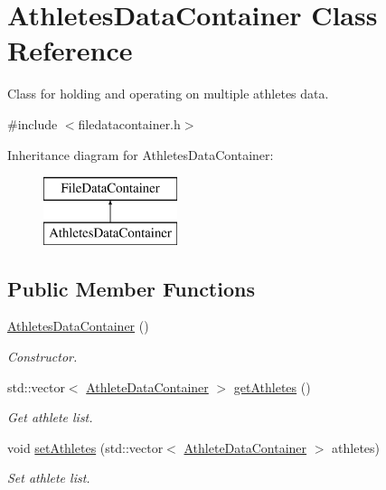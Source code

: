 \hypertarget{classAthletesDataContainer}{}\section{Athletes\+Data\+Container Class Reference}
\label{classAthletesDataContainer}


Class for holding and operating on multiple athletes data.  




{\ttfamily \#include $<$filedatacontainer.\+h$>$}

Inheritance diagram for Athletes\+Data\+Container\+:\begin{figure}[H]
\begin{center}
\leavevmode
\includegraphics[height=2.000000cm]{classAthletesDataContainer}
\end{center}
\end{figure}
\subsection*{Public Member Functions}
\begin{DoxyCompactItemize}
\item 
\mbox{\hyperlink{classAthletesDataContainer_a2c04d6c080a99c14fb7bb71055356368}{Athletes\+Data\+Container}} ()
\begin{DoxyCompactList}\small\item\em Constructor. \end{DoxyCompactList}\item 
std\+::vector$<$ \mbox{\hyperlink{classAthleteDataContainer}{Athlete\+Data\+Container}} $>$ \mbox{\hyperlink{classAthletesDataContainer_aab7693b0ba7095c91afa6b4c4c687522}{get\+Athletes}} ()
\begin{DoxyCompactList}\small\item\em Get athlete list. \end{DoxyCompactList}\item 
void \mbox{\hyperlink{classAthletesDataContainer_a995bd1c1985906ab41b0c6c19937cb3c}{set\+Athletes}} (std\+::vector$<$ \mbox{\hyperlink{classAthleteDataContainer}{Athlete\+Data\+Container}} $>$ athletes)
\begin{DoxyCompactList}\small\item\em Set athlete list. \end{DoxyCompactList}\end{DoxyCompactItemize}


